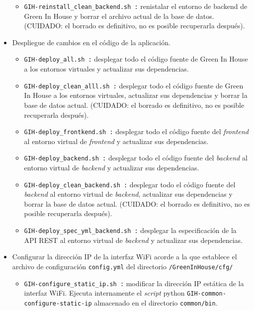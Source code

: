 \begin{itemize}
\begin{itemize}
                \item \texttt{GIH-reinstall\_clean\_backend.sh :} renistalar el entorno de backend de Green In House y borrar el archivo actual de la base de datos. 
                \color{red}(CUIDADO: el borrado es definitivo, no es posible recuperarla después). \color{black}
            \end{itemize}
            \item Despliegue de cambios en el código de la aplicación. 
            \begin{itemize}
                \item \texttt{GIH-deploy\_all.sh :} desplegar todo el código fuente de Green In House a los entornos virtuales y actualizar sus dependencias.
                \item \texttt{GIH-deploy\_clean\_alll.sh :} desplegar todo el código fuente de Green In House a los entornos virtuales, actualizar sus dependencias y borrar la base de datos actual.
                \color{red}(CUIDADO: el borrado es definitivo, no es posible recuperarla después). \color{black}
                \item \texttt{GIH-deploy\_frontkend.sh :} desplegar todo el código fuente del \textit{frontend} al entorno virtual de \textit{frontend} y actualizar sus dependencias.
                \item \texttt{GIH-deploy\_backend.sh :} desplegar todo el código fuente del \textit{backend} al entorno virtual de \textit{backend} y actualizar sus dependencias.
                \item \texttt{GIH-deploy\_clean\_backend.sh :} desplegar todo el código fuente del \textit{backend} al entorno virtual de \textit{backend}, actualizar sus dependencias y borrar la base de datos actual.
                \color{red}(CUIDADO: el borrado es definitivo, no es posible recuperarla después). \color{black}
                \item \texttt{GIH-deploy\_spec\_yml\_backend.sh :} desplegar la especificación de la API REST al entorno virtual de \textit{backend} y actualizar sus dependencias.
            \end{itemize}  
            \item Configurar la dirección IP de la interfaz WiFi acorde a la que establece el archivo de configuración \texttt{config.yml} del directorio \texttt{/GreenInHouse/cfg/}
            \begin{itemize}
                \item \texttt{GIH-configure\_static\_ip.sh :} modificar la dirección IP estática de la interfaz WiFi. Ejecuta internamente el \textit{script} python \texttt{GIH-common-configure-static-ip} almacenado en el directorio \texttt{common/bin}.

\end{itemize}
\end{itemize}
